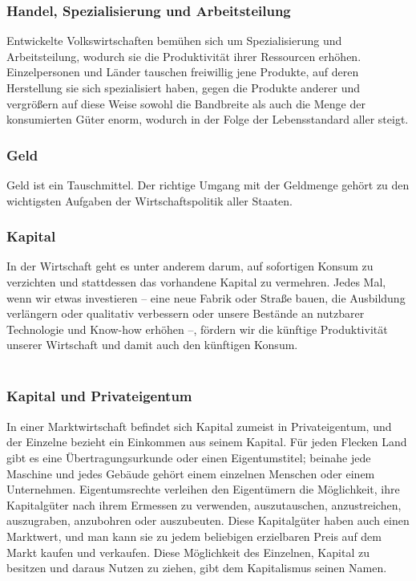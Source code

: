 \documentclass[10pt]{scrartcl}
\begin{document}
\subsubsection{Handel, Spezialisierung und Arbeitsteilung}
Entwickelte Volkswirtschaften bemühen sich um Spezialisierung und Arbeitsteilung, wodurch sie die Produktivität ihrer Ressourcen erhöhen. Einzelpersonen und Länder tauschen freiwillig jene Produkte, auf deren Herstellung sie sich spezialisiert haben, gegen die Produkte anderer und vergrößern auf diese Weise sowohl die Bandbreite als auch die Menge der konsumierten Güter enorm, wodurch in der Folge der Lebensstandard aller steigt.
\subsubsection{Geld}
Geld ist ein Tauschmittel. Der richtige Umgang mit der Geldmenge gehört zu den wichtigsten Aufgaben der Wirtschaftspolitik aller Staaten.
\subsubsection{Kapital}
In der Wirtschaft geht es unter anderem darum, auf sofortigen Konsum zu verzichten und stattdessen das vorhandene Kapital zu vermehren. Jedes Mal, wenn wir etwas investieren – eine neue Fabrik oder Straße bauen, die Ausbildung verlängern oder qualitativ verbessern oder unsere Bestände an nutzbarer Technologie und Know-how erhöhen –, fördern wir die künftige Produktivität unserer Wirtschaft und damit auch den künftigen Konsum.\\
\\
\subsubsection{Kapital und Privateigentum}
In einer Marktwirtschaft befindet sich Kapital zumeist in Privateigentum, und der Einzelne bezieht ein Einkommen aus seinem Kapital. Für jeden Flecken Land gibt es eine Übertragungsurkunde oder einen Eigentumstitel; beinahe jede Maschine und jedes Gebäude gehört einem einzelnen Menschen oder einem Unternehmen. Eigentumsrechte verleihen den Eigentümern die Möglichkeit, ihre Kapitalgüter nach ihrem Ermessen zu verwenden, auszutauschen, anzustreichen, auszugraben, anzubohren oder auszubeuten. Diese Kapitalgüter haben auch einen Marktwert, und man kann sie zu jedem beliebigen erzielbaren Preis auf dem Markt kaufen und verkaufen. Diese Möglichkeit des Einzelnen, Kapital zu besitzen und daraus Nutzen zu ziehen, gibt dem Kapitalismus seinen Namen.
\end{document}
